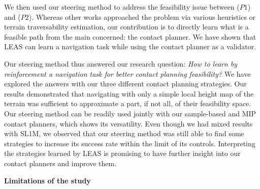 
We then used our steering method to address the feasibility issue between ($P1$) and ($P2$).
Whereas other works approached the problem via various heuristics or terrain traversability estimation, our contribution is to directly learn what is a feasible path from the main concerned: the contact planner.
We have shown that LEAS can learn a navigation task while using the contact planner as a validator.



Our steering method thus answered our research question: \textit{How to learn by reinforcement a navigation task for better contact planning feasibility?}
We have explored the answers with our three different contact planning strategies.
Our results demonstrated that navigating with only a simple local height map of the terrain was sufficient to approximate a part, if not all, of their feasibility space.
Our steering method can be readily used jointly with our sample-based and MIP contact planners, which shows its versatility. 
Even though we had mixed results with SL1M, we observed that our steering method was still able to find some strategies to increase its success rate within the limit of its controls.
Interpreting the strategies learned by LEAS is promising to have further insight into our contact planners and improve them.


\hfill \break
\hfill \break

\noindent\textbf{Limitations of the study}\\


